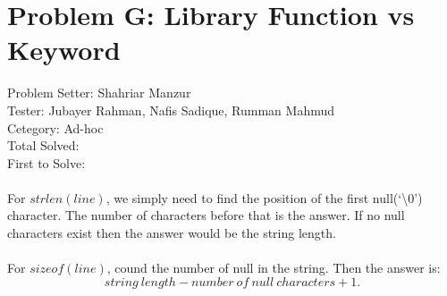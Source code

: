 \section*{Problem G: Library Function vs Keyword}
Problem Setter: Shahriar Manzur \\
Tester: Jubayer Rahman, Nafis Sadique, Rumman Mahmud \\
Cetegory: Ad-hoc \\
Total Solved:  \\
First to Solve: \\
\\
For $strlen(line)$, we simply need to find the position of the first null(`\textbackslash 0') character.
The number of characters before that is the answer. If no null characters exist then
the answer would be the string length.
\\ \\
For $sizeof(line)$, cound the number of null in the string. Then the answer is:
\begin{equation*}
    string\ length - number\ of\ null\ characters + 1.
\end{equation*}



